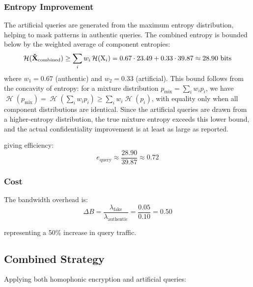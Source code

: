 \documentclass[final,11pt]{article}
\newcommand{\rvhqb}[1][]{%
   \ifthenelse{ \equal{#1}{} }
      {\ensuremath{\rv{\vec{\check{X}}}}}
      {\ensuremath{\rv{\vec{\check{X}_{#1}}}}}
}
\newcommand{\rv}[1]{\mathrm{#1}}
\newcommand{\entropy}{\operatorname{\mathcal{H}}}
\renewcommand{\vec}[1]{\boldsymbol{\mathbf{#1}}}
\numberwithin{equation}{section}
\theoremstyle{plain}
\theoremstyle{remark}
\begin{document}
\subsubsection{Entropy Improvement}
The artificial queries are generated from the maximum entropy distribution, helping to mask patterns in authentic queries. The combined entropy is bounded below by the weighted average of component entropies:
\begin{equation}
    \entropy(\rvhqb_{\text{combined}}) \geq \sum_i w_i \entropy(\rv{X}_i) = 0.67 \cdot 23.49 + 0.33 \cdot 39.87 \approx 28.90 \text{ bits}
\end{equation}
where $w_1 = 0.67$ (authentic) and $w_2 = 0.33$ (artificial). This bound follows from the concavity of entropy: for a mixture distribution $p_{\text{mix}} = \sum_i w_i p_i$, we have $\entropy(p_{\text{mix}}) = \entropy\!\left(\sum_i w_i p_i\right) \geq \sum_i w_i \entropy(p_i)$, with equality only when all component distributions are identical. Since the artificial queries are drawn from a higher-entropy distribution, the true mixture entropy exceeds this lower bound, and the actual confidentiality improvement is at least as large as reported.

giving efficiency:
\begin{equation}
    e_{\text{query}} \approx \frac{28.90}{39.87} \approx 0.72
\end{equation}

\subsubsection{Cost}
The bandwidth overhead is:
\begin{equation}
    \Delta B = \frac{\lambda_{\text{fake}}}{\lambda_{\text{authentic}}} = \frac{0.05}{0.10} = 0.50
\end{equation}

representing a 50\% increase in query traffic.

\subsection{Combined Strategy}
Applying both homophonic encryption and artificial queries:
\end{document}
